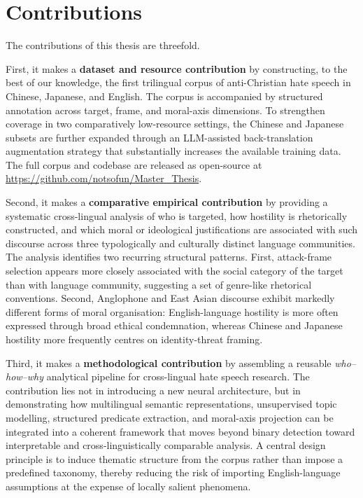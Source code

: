 \documentclass[../CLthesis.tex]{subfiles}
\begin{document}
\section{Contributions}

The contributions of this thesis are threefold.

First, it makes a \textbf{dataset and resource contribution} by constructing, to the best of our knowledge, the first trilingual corpus of anti-Christian hate speech in Chinese, Japanese, and English. The corpus is accompanied by structured annotation across target, frame, and moral-axis dimensions. To strengthen coverage in two comparatively low-resource settings, the Chinese and Japanese subsets are further expanded through an LLM-assisted back-translation augmentation strategy that substantially increases the available training data. The full corpus and codebase are released as open-source at \url{https://github.com/notsofun/Master_Thesis}.

Second, it makes a \textbf{comparative empirical contribution} by providing a systematic cross-lingual analysis of who is targeted, how hostility is rhetorically constructed, and which moral or ideological justifications are associated with such discourse across three typologically and culturally distinct language communities. The analysis identifies two recurring structural patterns. First, attack-frame selection appears more closely associated with the social category of the target than with language community, suggesting a set of genre-like rhetorical conventions. Second, Anglophone and East Asian discourse exhibit markedly different forms of moral organisation: English-language hostility is more often expressed through broad ethical condemnation, whereas Chinese and Japanese hostility more frequently centres on identity-threat framing.

Third, it makes a \textbf{methodological contribution} by assembling a reusable \emph{who--how--why} analytical pipeline for cross-lingual hate speech research. The contribution lies not in introducing a new neural architecture, but in demonstrating how multilingual semantic representations, unsupervised topic modelling, structured predicate extraction, and moral-axis projection can be integrated into a coherent framework that moves beyond binary detection toward interpretable and cross-linguistically comparable analysis. A central design principle is to induce thematic structure from the corpus rather than impose a predefined taxonomy, thereby reducing the risk of importing English-language assumptions at the expense of locally salient phenomena.
\end{document}

